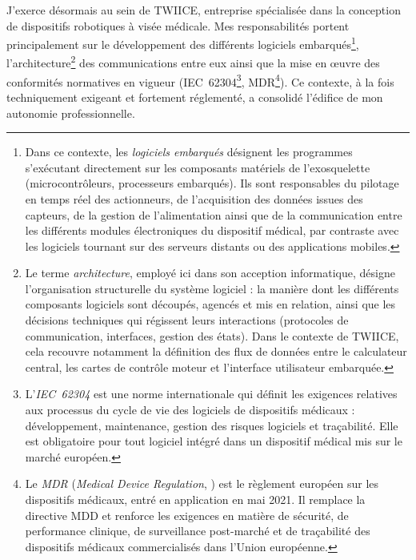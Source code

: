 J'exerce désormais au sein de TWIICE, entreprise spécialisée dans la conception de dispositifs robotiques à visée médicale. Mes responsabilités portent principalement sur le développement des différents logiciels embarqués\footnote{Dans ce contexte, les \emph{logiciels embarqués} désignent les programmes s'exécutant directement sur les composants matériels de l'exosquelette (microcontrôleurs, processeurs embarqués). Ils sont responsables du pilotage en temps réel des actionneurs, de l'acquisition des données issues des capteurs, de la gestion de l'alimentation ainsi que de la communication entre les différents modules électroniques du dispositif médical, par contraste avec les logiciels tournant sur des serveurs distants ou des applications mobiles.}, l'architecture\footnote{Le terme \emph{architecture}, employé ici dans son acception informatique, désigne l'organisation structurelle du système logiciel : la manière dont les différents composants logiciels sont découpés, agencés et mis en relation, ainsi que les décisions techniques qui régissent leurs interactions (protocoles de communication, interfaces, gestion des états). Dans le contexte de TWIICE, cela recouvre notamment la définition des flux de données entre le calculateur central, les cartes de contrôle moteur et l'interface utilisateur embarquée.} des communications entre eux ainsi que la mise en œuvre des conformités normatives en vigueur (IEC~62304\footnote{L'\emph{IEC~62304} \citep{iec62304} est une norme internationale qui définit les exigences relatives aux processus du cycle de vie des logiciels de dispositifs médicaux : développement, maintenance, gestion des risques logiciels et traçabilité. Elle est obligatoire pour tout logiciel intégré dans un dispositif médical mis sur le marché européen.\label{fn:iec62304}}, MDR\footnote{Le \emph{MDR} (\textit{Medical Device Regulation}, \citealp{mdr2017}) est le règlement européen sur les dispositifs médicaux, entré en application en mai 2021. Il remplace la directive MDD et renforce les exigences en matière de sécurité, de performance clinique, de surveillance post-marché et de traçabilité des dispositifs médicaux commercialisés dans l'Union européenne.}). Ce contexte, à la fois techniquement exigeant et fortement réglementé, a consolidé l'édifice de mon autonomie professionnelle.

